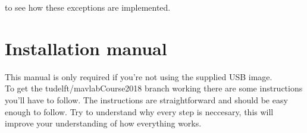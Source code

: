 \documentclass{article}
\begin{document}
 to see how these exceptions are implemented. 

\clearpage
\section*{Installation manual}

This manual is only required if you're not using the supplied USB image.\\

\noindent To get the tudelft/mavlabCourse2018 branch working there are some instructions you'll have to follow. The instructions are straightforward and should be easy enough to follow. Try to understand why every step is neccesary, this will improve your understanding of how everything works.
\end{document}
